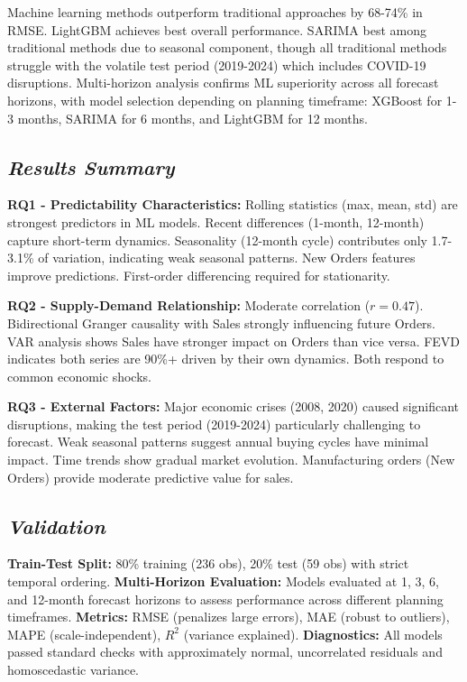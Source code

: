 \documentclass[12pt]{article}
\begin{document}
Machine learning methods outperform traditional approaches by 68-74\% in RMSE. LightGBM achieves best overall performance. SARIMA best among traditional methods due to seasonal component, though all traditional methods struggle with the volatile test period (2019-2024) which includes COVID-19 disruptions. Multi-horizon analysis confirms ML superiority across all forecast horizons, with model selection depending on planning timeframe: XGBoost for 1-3 months, SARIMA for 6 months, and LightGBM for 12 months.

\subsection*{\textit{Results Summary}}

\textbf{RQ1 - Predictability Characteristics:} Rolling statistics (max, mean, std) are strongest predictors in ML models. Recent differences (1-month, 12-month) capture short-term dynamics. Seasonality (12-month cycle) contributes only 1.7-3.1\% of variation, indicating weak seasonal patterns. New Orders features improve predictions. First-order differencing required for stationarity.

\textbf{RQ2 - Supply-Demand Relationship:} Moderate correlation ($r = 0.47$). Bidirectional Granger causality with Sales strongly influencing future Orders. VAR analysis shows Sales have stronger impact on Orders than vice versa. FEVD indicates both series are 90\%+ driven by their own dynamics. Both respond to common economic shocks.

\textbf{RQ3 - External Factors:} Major economic crises (2008, 2020) caused significant disruptions, making the test period (2019-2024) particularly challenging to forecast. Weak seasonal patterns suggest annual buying cycles have minimal impact. Time trends show gradual market evolution. Manufacturing orders (New Orders) provide moderate predictive value for sales.

\subsection*{\textit{Validation}}

\textbf{Train-Test Split:} 80\% training (236 obs), 20\% test (59 obs) with strict temporal ordering. \textbf{Multi-Horizon Evaluation:} Models evaluated at 1, 3, 6, and 12-month forecast horizons to assess performance across different planning timeframes. \textbf{Metrics:} RMSE (penalizes large errors), MAE (robust to outliers), MAPE (scale-independent), $R^2$ (variance explained). \textbf{Diagnostics:} All models passed standard checks with approximately normal, uncorrelated residuals and homoscedastic variance.
\end{document}
